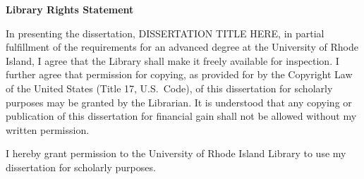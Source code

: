 %
%
\thispagestyle{empty}
\null\vfill
\begin{center}
{\bf Library Rights Statement}\\
\end{center}
In presenting the dissertation, DISSERTATION TITLE HERE, in partial fulfillment  %
of the requirements for an advanced degree at the University of Rhode
Island, I agree that the Library shall make it freely available for
inspection.  I further agree that permission for copying, as provided
for by the Copyright Law of the United States (Title 17, U.S.~Code),
of this {dissertation} for scholarly purposes may be granted by the  %
Librarian.  It is understood that any copying or publication of this
{dissertation} for financial gain shall not be allowed without my written  %
permission.

I hereby
\if@libraryrights\else
\fi
grant permission to the University of Rhode Island Library to use
my {dissertation} for scholarly purposes.  %

\begin{center}
\shortstack{\rule{0in}{0.4in}\\\rule{3in}{0.4pt}\\Date}
\end{center}
\vfill
\newpage
